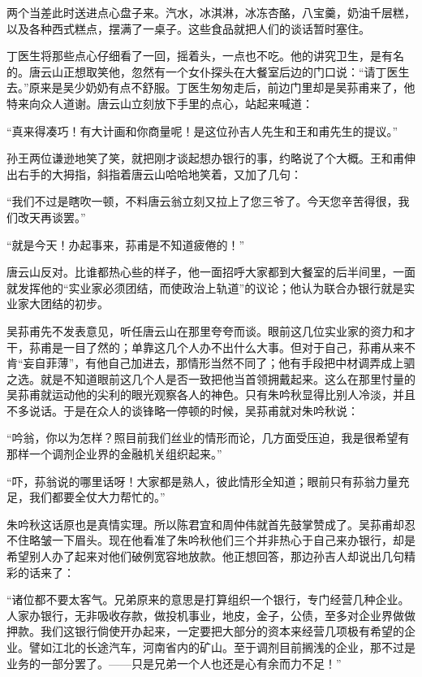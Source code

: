 \par 两个当差此时送进点心盘子来。汽水，冰淇淋，冰冻杏酪，八宝羹，奶油千层糕，以及各种西式糕点，摆满了一桌子。这些食品就把人们的谈话暂时塞住。
\par 丁医生将那些点心仔细看了一回，摇着头，一点也不吃。他的讲究卫生，是有名的。唐云山正想取笑他，忽然有一个女仆探头在大餐室后边的门口说：“请丁医生去。”原来是吴少奶奶有点不舒服。丁医生匆匆走后，前边门里却是吴荪甫来了，他特来向众人道谢。唐云山立刻放下手里的点心，站起来喊道：
\par “真来得凑巧！有大计画和你商量呢！是这位孙吉人先生和王和甫先生的提议。”
\par 孙王两位谦逊地笑了笑，就把刚才谈起想办银行的事，约略说了个大概。王和甫伸出右手的大拇指，斜指着唐云山哈哈地笑着，又加了几句：
\par “我们不过是瞎吹一顿，不料唐云翁立刻又拉上了您三爷了。今天您辛苦得很，我们改天再谈罢。”
\par “就是今天！办起事来，荪甫是不知道疲倦的！”
\par 唐云山反对。比谁都热心些的样子，他一面招呼大家都到大餐室的后半间里，一面就发挥他的“实业家必须团结，而使政治上轨道”的议论；他认为联合办银行就是实业家大团结的初步。
\par 吴荪甫先不发表意见，听任唐云山在那里夸夸而谈。眼前这几位实业家的资力和才干，荪甫是一目了然的；单靠这几个人办不出什么大事。但对于自己，荪甫从来不肯“妄自菲薄”，有他自己加进去，那情形当然不同了；他有手段把中材调弄成上驷之选。就是不知道眼前这几个人是否一致把他当首领拥戴起来。这么在那里忖量的吴荪甫就运动他的尖利的眼光观察各人的神色。只有朱吟秋显得比别人冷淡，并且不多说话。于是在众人的谈锋略一停顿的时候，吴荪甫就对朱吟秋说：
\par “吟翁，你以为怎样？照目前我们丝业的情形而论，几方面受压迫，我是很希望有那样一个调剂企业界的金融机关组织起来。”
\par “吓，荪翁说的哪里话呀！大家都是熟人，彼此情形全知道；眼前只有荪翁力量充足，我们都要全仗大力帮忙的。”
\par 朱吟秋这话原也是真情实理。所以陈君宜和周仲伟就首先鼓掌赞成了。吴荪甫却忍不住略皱一下眉头。现在他看准了朱吟秋他们三个并非热心于自己来办银行，却是希望别人办了起来对他们破例宽容地放款。他正想回答，那边孙吉人却说出几句精彩的话来了：
\par “诸位都不要太客气。兄弟原来的意思是打算组织一个银行，专门经营几种企业。人家办银行，无非吸收存款，做投机事业，地皮，金子，公债，至多对企业界做做押款。我们这银行倘使开办起来，一定要把大部分的资本来经营几项极有希望的企业。譬如江北的长途汽车，河南省内的矿山。至于调剂目前搁浅的企业，那不过是业务的一部分罢了。——只是兄弟一个人也还是心有余而力不足！”
